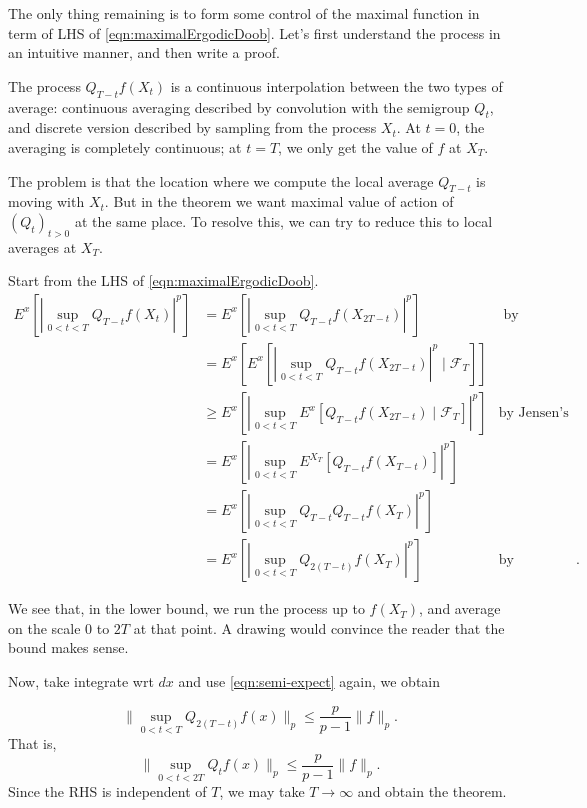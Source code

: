The only thing remaining is to form some control of the maximal function in term of LHS of \eqref{eqn:maximalErgodicDoob}. Let's first understand the process in an intuitive manner, and then write a proof.

The process $Q_{T - t}f(X_t)$ is a continuous interpolation between the two types of average: continuous averaging described by convolution with the semigroup $Q_t$, and discrete version described by sampling from the process $X_t$. At $t = 0$, the averaging is completely continuous; at $t = T$, we only get the value of $f$ at $X_T$. 

The problem is that the location where we compute the local average $Q_{T - t}$ is moving with $X_t$. But in the theorem we want maximal value of action of $(Q_t)_{t > 0}$ at the same place. To resolve this, we can try to reduce this to local averages at $X_T$.

Start from the LHS of \eqref{eqn:maximalErgodicDoob}.
\begin{align*}
	E^x\left[ \left| \sup _{0 < t < T} Q_{T - t} f(X_t) \right|^p  \right] 
	&= E^x\left[ \left| \sup _{0 < t < T} Q_{T - t} f(X_{2 T - t}) \right|^p  \right] & \text{ by reversibility}\\
	&= E^x\left[ E^x\left[\left| \sup _{0 < t < T} Q_{T - t} f(X_{2 T - t}) \right|^p  \mid \mathcal{F}_T\right]\right] & \text{}\\
	&\geq E^x\left[ \left| \sup _{0 < t < T}E^x\left[ Q_{T - t} f(X_{2 T - t})  \mid \mathcal{F}_T\right] \right|^p \right] & \text{by Jensen's inequality}\\
	&= E^x\left[ \left| \sup _{0 < t < T}E^{X_T}\left[ Q_{T - t} f(X_{T - t})\right] \right|^p \right]\\
	&= E^x\left[ \left| \sup _{0 < t < T}Q_{T - t} Q_{T - t} f(X_{T}) \right|^p \right]\\
	&= E^x\left[ \left| \sup _{0 < t < T}Q_{2(T - t)} f(X_{T}) \right|^p \right] & \text{by semigroup property}
.\end{align*}

We see that, in the lower bound, we run the process up to $f(X_T)$, and average on the scale 0 to $2 T$ at that point. A drawing would convince the reader that the bound makes sense.

Now, take integrate wrt $dx $ and use \eqref{eqn:semi-expect} again, we obtain

\[
	\| \sup _{0 < t < T}Q_{2(T - t)} f(x)\|_p \le \frac{p}{p-1} \|f\|_p
.\] 
That is,
\[
	\| \sup _{0 < t < 2T}Q_{t} f(x)\|_p \le \frac{p}{p-1} \|f\|_p
.\]
Since the RHS is independent of $T$, we may take $T \to \infty $ and obtain the theorem.


